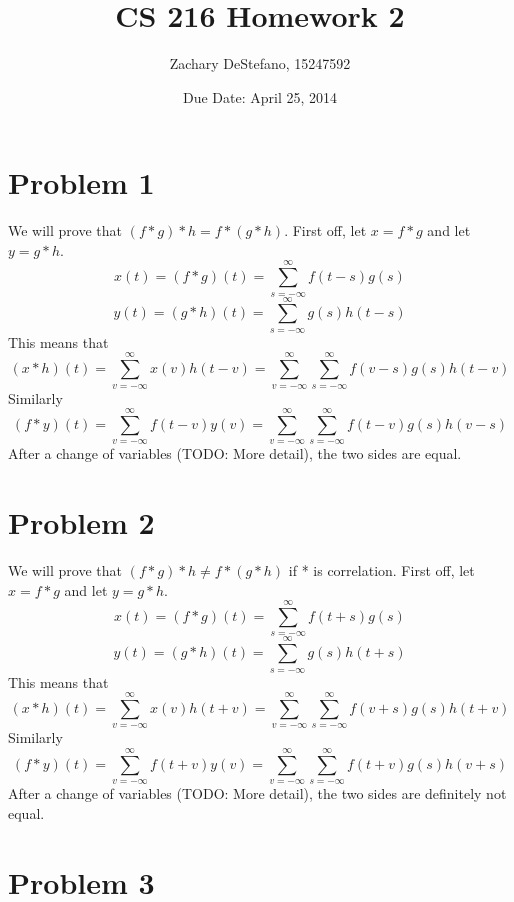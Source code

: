 \documentclass[11pt,psfig]{article}
\begin{document}
\setlength{\parskip}{1.2ex plus0.3ex minus 0.3ex}


\thispagestyle{empty} \pagestyle{myheadings} 



\title{CS 216 Homework 2}
\author{Zachary DeStefano, 15247592}
\date{Due Date: April 25, 2014}

\maketitle

\vfill\eject

\newpage

\section*{Problem 1}

We will prove that $(f*g)*h=f*(g*h)$. First off, let $x=f*g$ and let $y=g*h$. \\
\[
x(t) = (f*g)(t) = \sum_{s=-\infty}^{\infty} f(t-s)g(s)
\]
\[
y(t) = (g*h)(t) = \sum_{s=-\infty}^{\infty} g(s)h(t-s)
\]
This means that
\[
(x*h)(t) = \sum_{v=-\infty}^{\infty} x(v)h(t-v) = \sum_{v=-\infty}^{\infty} \sum_{s=-\infty}^{\infty} f(v-s)g(s)h(t-v)
\]
Similarly
\[
(f*y)(t) = \sum_{v=-\infty}^{\infty} f(t-v)y(v) = \sum_{v=-\infty}^{\infty} \sum_{s=-\infty}^{\infty} f(t-v)g(s)h(v-s)
\]
After a change of variables (TODO: More detail), the two sides are equal. 

\section*{Problem 2}

We will prove that $(f*g)*h \neq f*(g*h)$ if * is correlation. First off, let $x=f*g$ and let $y=g*h$. \\
\[
x(t) = (f*g)(t) = \sum_{s=-\infty}^{\infty} f(t+s)g(s)
\]
\[
y(t) = (g*h)(t) = \sum_{s=-\infty}^{\infty} g(s)h(t+s)
\]
This means that
\[
(x*h)(t) = \sum_{v=-\infty}^{\infty} x(v)h(t+v) = \sum_{v=-\infty}^{\infty} \sum_{s=-\infty}^{\infty} f(v+s)g(s)h(t+v)
\]
Similarly
\[
(f*y)(t) = \sum_{v=-\infty}^{\infty} f(t+v)y(v) = \sum_{v=-\infty}^{\infty} \sum_{s=-\infty}^{\infty} f(t+v)g(s)h(v+s)
\]
After a change of variables (TODO: More detail), the two sides are definitely not equal. 

\section*{Problem 3}
\end{document}
